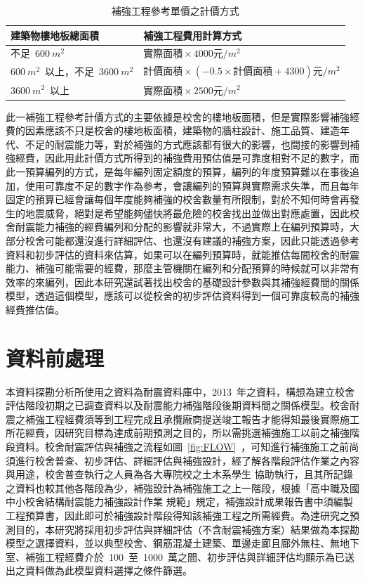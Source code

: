 \setlength{\tabcolsep}{1em}
{\renewcommand{\arraystretch}{1.5}
\begin{table}[hbtp]
  \begin{center}
    \caption{補強工程參考單價之計價方式}
    \label{tab:cost_result_table}
    \begin{tabular}{l l}
      \hline
      建築物樓地板總面積 & 補強工程費用計算方式 \\
      \hline
      不足~$600~m^2$ & $\text{實際面積} \times 4000 \text{元}/m^2$ \\
      $600~m^2$~以上，不足~$3600~m^2$ & $\text{計價面積} \times (-0.5 \times \text{計價面積} + 4300) \text{元}/m^2$ \\
      $3600~m^2$~以上 & $\text{實際面積} \times 2500 \text{元}/m^2$ \\
      \hline
      \end{tabular}
  \end{center}
\end{table}
}

此一補強工程參考計價方式的主要依據是校舍的樓地板面積，但是實際影響補強經費的因素應該不只是校舍的樓地板面積，建築物的牆柱設計、施工品質、建造年代、不足的耐震能力等，對於補強的方式應該都有很大的影響，也間接的影響到補強經費，因此用此計價方式所得到的補強費用預估值是可靠度相對不足的數字，而此一預算編列的方式，是每年編列固定額度的預算，編列的年度預算難以在事後追加，使用可靠度不足的數字作為參考，會讓編列的預算與實際需求失準，而且每年固定的預算已經會讓每個年度能夠補強的校舍數量有所限制，對於不知何時會再發生的地震威脅，絕對是希望能夠儘快將最危險的校舍找出並做出對應處置，因此校舍耐震能力補強的經費編列和分配的影響就非常大，不過實際上在編列預算時，大部分校舍可能都還沒進行詳細評估、也還沒有建議的補強方案，因此只能透過參考資料和初步評估的資料來估算，如果可以在編列預算時，就能推估每間校舍的耐震能力、補強可能需要的經費，那麼主管機關在編列和分配預算的時候就可以非常有效率的來編列，因此本研究還試著找出校舍的基礎設計參數與其補強經費間的關係模型，透過這個模型，應該可以從校舍的初步評估資料得到一個可靠度較高的補強經費推估值。


\section{資料前處理}

本資料探勘分析所使用之資料為耐震資料庫中，2013~年之資料，構想為建立校舍評估階段初期之已調查資料以及耐震能力補強階段後期資料間之關係模型。校舍耐震之補強工程經費須等到工程完成且承攬廠商提送竣工報告才能得知最後實際施工所花經費，因研究目標為達成前期預測之目的，所以需挑選補強施工以前之補強階段資料。校舍耐震評估與補強之流程如圖~\ref{fig:FLOW}~，可知進行補強施工之前尚須進行校舍普查、初步評估、詳細評估與補強設計，經了解各階段評估作業之內容與用途，校舍普查執行之人員為各大專院校之土木系學生 協助執行，且其所記錄之資料也較其他各階段為少，補強設計為補強施工之上一階段，根據「高中職及國中小校舍結構耐震能力補強設計作業 規範」規定，補強設計成果報告書中須編製工程預算書，因此即可於補強設計階段得知該補強工程之所需經費。為達研究之預測目的，本研究將採用初步評估與詳細評估（不含耐震補強方案）結果做為本探勘模型之選擇資料，並以典型校舍、鋼筋混凝土建築、單邊走廊且廊外無柱、無地下室、補強工程經費介於~100~至~1000~萬之間、初步評估與詳細評估均顯示為已送出之資料做為此模型資料選擇之條件篩選。

